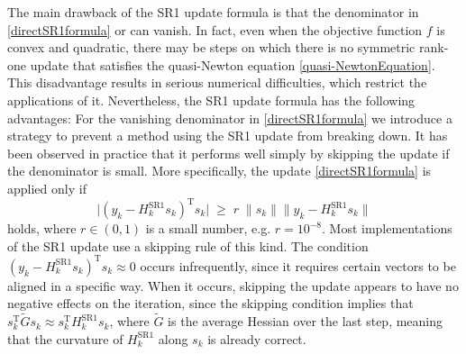 The main drawback of the SR1 update formula is that the denominator in \cref{directSR1formula} or   can vanish. In fact, even when the objective function $f$ is convex and quadratic, there may be steps on which there is no symmetric rank-one update that satisfies the quasi-Newton equation \cref{quasi-NewtonEquation}. This disadvantage results in serious numerical difficulties, which restrict the applications of it. Nevertheless, the SR1 update formula has the following advantages:
For the vanishing denominator in \cref{directSR1formula} we introduce a strategy to prevent a method using the SR1 update from breaking down. It has been observed in practice that it performs well simply by skipping the update if the denominator is small. More specifically, the update \cref{directSR1formula} is applied only if 
\begin{equation}
    \lvert (y_k - H^\mathrm{SR1}_k s_k)^{\mathrm{T}} s_k \lvert \; \geq \; r \; \lVert s_k \rVert \lVert y_k - H^\mathrm{SR1}_k s_k \rVert 
\end{equation}
holds, where $r \in (0, 1)$ is a small number, e.g. $r = 10^{−8}$. Most implementations of the SR1 update use a skipping rule of this kind. The condition $(y_k - H^\mathrm{SR1}_k s_k)^{\mathrm{T}} s_k \approx 0$ occurs infrequently, since it requires certain vectors to be aligned in a specific way. When it occurs, skipping the update appears to have no negative effects on the iteration, since the skipping condition implies that $s^{\mathrm{T}}_k \tilde{G} s_k \approx s^{\mathrm{T}}_k H^\mathrm{SR1}_k s_k$, where $\tilde{G}$ is the average Hessian over the last step, meaning that the curvature of $H^\mathrm{SR1}_k$ along $s_k$ is already correct. \\






